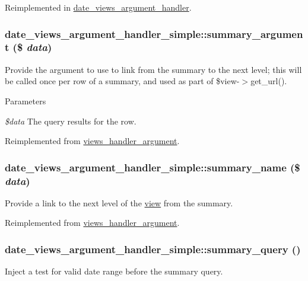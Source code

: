 Reimplemented in \hyperlink{classdate__views__argument__handler_aa7df86c9e200ef7e797e1ba4f2fa1158}{date\_\-views\_\-argument\_\-handler}.\hypertarget{classdate__views__argument__handler__simple_abf0949dba7eba44e72cb5f935285716e}{
\subsubsection[{summary\_\-argument}]{\setlength{\rightskip}{0pt plus 5cm}date\_\-views\_\-argument\_\-handler\_\-simple::summary\_\-argument (\$ {\em data})}}
\label{classdate__views__argument__handler__simple_abf0949dba7eba44e72cb5f935285716e}
Provide the argument to use to link from the summary to the next level; this will be called once per row of a summary, and used as part of \$view-\/$>$get\_\-url().


\begin{DoxyParams}{Parameters}
\item[{\em \$data}]The query results for the row. \end{DoxyParams}


Reimplemented from \hyperlink{classviews__handler__argument_aad03acefdb44288d7e6c7793bc33f66c}{views\_\-handler\_\-argument}.\hypertarget{classdate__views__argument__handler__simple_a012035138d65e75b0f70af0e2024aa29}{
\subsubsection[{summary\_\-name}]{\setlength{\rightskip}{0pt plus 5cm}date\_\-views\_\-argument\_\-handler\_\-simple::summary\_\-name (\$ {\em data})}}
\label{classdate__views__argument__handler__simple_a012035138d65e75b0f70af0e2024aa29}
Provide a link to the next level of the \hyperlink{classview}{view} from the summary. 

Reimplemented from \hyperlink{classviews__handler__argument_a4c55a340453eed4d35c69f7ac790cac1}{views\_\-handler\_\-argument}.\hypertarget{classdate__views__argument__handler__simple_abfe22d750f3ce21303be3343499757c1}{
\subsubsection[{summary\_\-query}]{\setlength{\rightskip}{0pt plus 5cm}date\_\-views\_\-argument\_\-handler\_\-simple::summary\_\-query ()}}
\label{classdate__views__argument__handler__simple_abfe22d750f3ce21303be3343499757c1}
Inject a test for valid date range before the summary query. 

